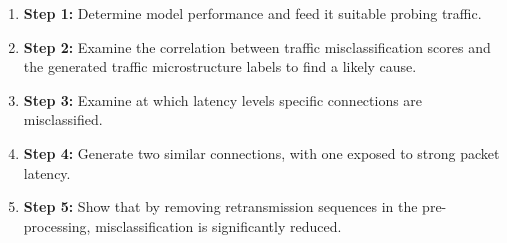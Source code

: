 \documentclass[conference]{IEEEtran}
\begin{document}
\begin{enumerate}
\item [] \textbf{Step 1:} Determine model performance and feed it suitable probing traffic.
\item [] \textbf{Step 2:} Examine the correlation between traffic misclassification scores and the generated traffic microstructure labels to find a likely cause.%
\item [] \textbf{Step 3:} Examine at which latency levels specific connections are misclassified.

\item [] \textbf{Step 4:} Generate two similar connections, with one exposed to strong packet latency.%
\item [] \textbf{Step 5:} Show that by removing retransmission sequences in the pre-processing, misclassification is significantly reduced.
\end{enumerate}







\end{document}
